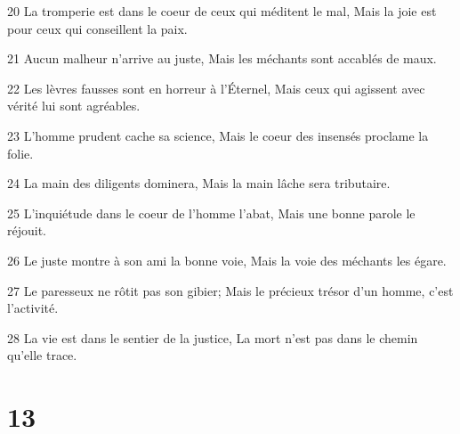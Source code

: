 \par 20 La tromperie est dans le coeur de ceux qui méditent le mal, Mais la joie est pour ceux qui conseillent la paix.
\par 21 Aucun malheur n'arrive au juste, Mais les méchants sont accablés de maux.
\par 22 Les lèvres fausses sont en horreur à l'Éternel, Mais ceux qui agissent avec vérité lui sont agréables.
\par 23 L'homme prudent cache sa science, Mais le coeur des insensés proclame la folie.
\par 24 La main des diligents dominera, Mais la main lâche sera tributaire.
\par 25 L'inquiétude dans le coeur de l'homme l'abat, Mais une bonne parole le réjouit.
\par 26 Le juste montre à son ami la bonne voie, Mais la voie des méchants les égare.
\par 27 Le paresseux ne rôtit pas son gibier; Mais le précieux trésor d'un homme, c'est l'activité.
\par 28 La vie est dans le sentier de la justice, La mort n'est pas dans le chemin qu'elle trace.

\chapter{13}

